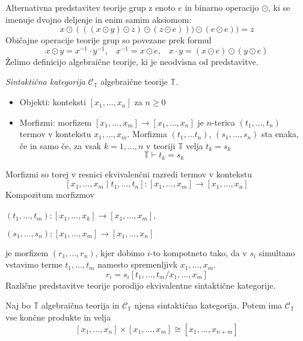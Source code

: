 %
Alternativna predstavitev teorije grup z enoto $e$ in binarno operacijo $\odot$, ki se imenuje dvojno deljenje in enim samim aksiomom:
$$x \odot (((x \odot y ) \odot z ) \odot ( z \odot e))) \odot (e \odot e) ) = z$$
Običajne operacije teorije grup so povezane prek formul
$$x \odot y = x^{-1} \cdot y^{-1} \text{,} \quad x^{-1} = x \odot e \text{,} \quad x \cdot y = (x \odot e) \odot (y \odot e)$$
%
Želimo definicijo algebraične teorije, ki je neodvisna od predstavitve.
%
\begin{definicija}
\emph{Sintaktična kategorija} $\mathcal{C}_\mathbb{T}$ algebraične teorije $\mathbb{T}$.
%
\begin{itemize}
\item Objekti: konteksti $[x_1, \ldots, x_n]$ za $n \geq 0$
%
\item Morfizmi: morfizem $[x_1, \ldots, x_m] \to [x_1, \ldots, x_n]$ je $n$-terica $(t_1, \ldots, t_n)$ termov v kontekstu $x_1, \ldots, x_m$. Morfizma $(t_1, \ldots t_n)$, $(s_1, \ldots, s_n)$ sta enaka, če in samo če, za vsak $k = 1, \ldots, n$ v teoriji $\mathbb{T}$ velja $t_k = s_k$
$$\mathbb{T} \vdash t_k = s_k$$
\end{itemize}
\end{definicija}
%
Morfizmi so torej v resnici ekvivalenčni razredi termov v kontekstu
$$[x_1, \ldots, x_m \mid t_1, \ldots, t_n] : [x_1, \ldots, x_m] \to [x_1, \ldots, x_n]$$
%
Kompozitum morfizmov
\begin{center}
\begin{description}
\item $(t_1, \ldots, t_m) : [x_1, \ldots, x_k] \to [x_1, \ldots, x_m]$,
\item $(s_1, \ldots, s_n) : [x_1, \ldots, x_m] \to [x_1, \ldots, x_n]$
\end{description}
\end{center}
je morfizem $(r_1, \ldots, r_n)$, kjer dobimo $i$-to kompotneto tako, da v $s_i$ simultano vstavimo terme $t_1, \ldots, t_m$ namesto spremenljivk $x_1, \ldots, x_m$.
$$r_i = s_i[t_1, \ldots, t_m / x_1, \ldots, x_m]$$
%
Različne predstavitve teorije porodijo ekvivalentne sintaktične kategorije.
%
\begin{lema}
Naj bo $\mathbb{T}$ algebraična teorija in $\mathcal{C}_\mathbb{T}$ njena sintaktična kategorija. Potem ima $\mathcal{C}_\mathbb{T}$ vse končne produkte in velja
$$[x_1, \ldots, x_n] \times [x_1, \ldots, x_m] \cong [x_1, \ldots, x_{n+m}]$$
\end{lema}
%
%
